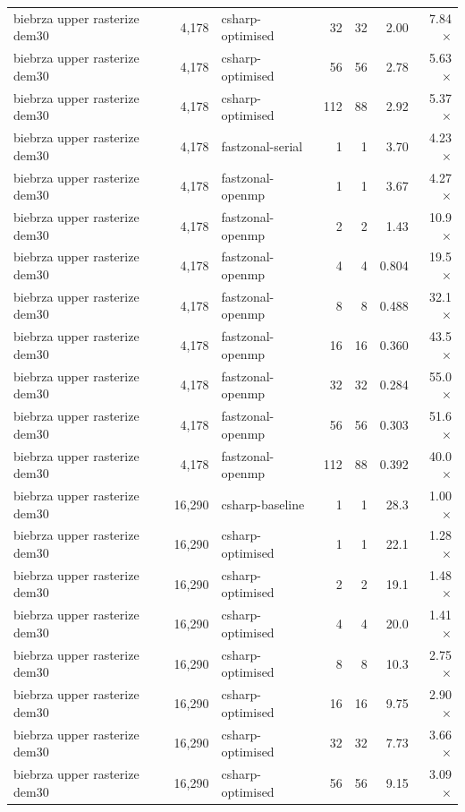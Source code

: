 \begin{tabular}{lrlrrrr}
biebrza upper rasterize dem30 & 4,178 & csharp-optimised & 32 & 32 & 2.00 & 7.84$\times$ \\
biebrza upper rasterize dem30 & 4,178 & csharp-optimised & 56 & 56 & 2.78 & 5.63$\times$ \\
biebrza upper rasterize dem30 & 4,178 & csharp-optimised & 112 & 88 & 2.92 & 5.37$\times$ \\
biebrza upper rasterize dem30 & 4,178 & fastzonal-serial & 1 & 1 & 3.70 & 4.23$\times$ \\
biebrza upper rasterize dem30 & 4,178 & fastzonal-openmp & 1 & 1 & 3.67 & 4.27$\times$ \\
biebrza upper rasterize dem30 & 4,178 & fastzonal-openmp & 2 & 2 & 1.43 & 10.9$\times$ \\
biebrza upper rasterize dem30 & 4,178 & fastzonal-openmp & 4 & 4 & 0.804 & 19.5$\times$ \\
biebrza upper rasterize dem30 & 4,178 & fastzonal-openmp & 8 & 8 & 0.488 & 32.1$\times$ \\
biebrza upper rasterize dem30 & 4,178 & fastzonal-openmp & 16 & 16 & 0.360 & 43.5$\times$ \\
biebrza upper rasterize dem30 & 4,178 & fastzonal-openmp & 32 & 32 & 0.284 & 55.0$\times$ \\
biebrza upper rasterize dem30 & 4,178 & fastzonal-openmp & 56 & 56 & 0.303 & 51.6$\times$ \\
biebrza upper rasterize dem30 & 4,178 & fastzonal-openmp & 112 & 88 & 0.392 & 40.0$\times$ \\
biebrza upper rasterize dem30 & 16,290 & csharp-baseline & 1 & 1 & 28.3 & 1.00$\times$ \\
biebrza upper rasterize dem30 & 16,290 & csharp-optimised & 1 & 1 & 22.1 & 1.28$\times$ \\
biebrza upper rasterize dem30 & 16,290 & csharp-optimised & 2 & 2 & 19.1 & 1.48$\times$ \\
biebrza upper rasterize dem30 & 16,290 & csharp-optimised & 4 & 4 & 20.0 & 1.41$\times$ \\
biebrza upper rasterize dem30 & 16,290 & csharp-optimised & 8 & 8 & 10.3 & 2.75$\times$ \\
biebrza upper rasterize dem30 & 16,290 & csharp-optimised & 16 & 16 & 9.75 & 2.90$\times$ \\
biebrza upper rasterize dem30 & 16,290 & csharp-optimised & 32 & 32 & 7.73 & 3.66$\times$ \\
biebrza upper rasterize dem30 & 16,290 & csharp-optimised & 56 & 56 & 9.15 & 3.09$\times$ \\

\end{tabular}
